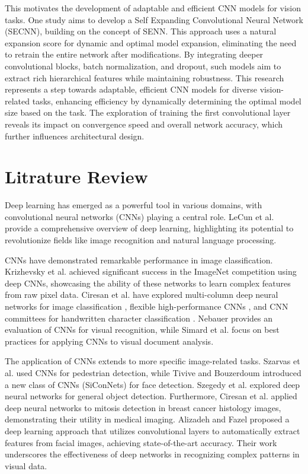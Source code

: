 \documentclass{article}
\begin{document}
This motivates the development of adaptable and efficient CNN models for vision tasks. One study aims to develop a Self Expanding Convolutional Neural Network (SECNN), building on the concept of SENN. This approach uses a natural expansion score for dynamic and optimal model expansion, eliminating the need to retrain the entire network after modifications. By integrating deeper convolutional blocks, batch normalization, and dropout, such models aim to extract rich hierarchical features while maintaining robustness. This research represents a step towards adaptable, efficient CNN models for diverse vision-related tasks, enhancing efficiency by dynamically determining the optimal model size based on the task. The exploration of training the first convolutional layer reveals its impact on convergence speed and overall network accuracy, which further influences architectural design.


\section*{Litrature Review}
Deep learning has emerged as a powerful tool in various domains, with convolutional neural networks (CNNs) playing a central role. LeCun et al. \cite{25} provide a comprehensive overview of deep learning, highlighting its potential to revolutionize fields like image recognition and natural language processing.

CNNs have demonstrated remarkable performance in image classification. Krizhevsky et al. \cite{22} achieved significant success in the ImageNet competition using deep CNNs, showcasing the ability of these networks to learn complex features from raw pixel data. Ciresan et al. have explored multi-column deep neural networks for image classification \cite{6}, flexible high-performance CNNs \cite{8}, and CNN committees for handwritten character classification \cite{9}. Nebauer \cite{28} provides an evaluation of CNNs for visual recognition, while Simard et al. \cite{29} focus on best practices for applying CNNs to visual document analysis.

The application of CNNs extends to more specific image-related tasks. Szarvas et al. \cite{31} used CNNs for pedestrian detection, while Tivive and Bouzerdoum \cite{33} introduced a new class of CNNs (SiConNets) for face detection. Szegedy et al. \cite{32} explored deep neural networks for general object detection. Furthermore, Ciresan et al. \cite{7} applied deep neural networks to mitosis detection in breast cancer histology images, demonstrating their utility in medical imaging. Alizadeh and Fazel \cite{2} proposed a deep learning approach that utilizes convolutional layers to automatically extract features from facial images, achieving state-of-the-art accuracy. Their work underscores the effectiveness of deep networks in recognizing complex patterns in visual data.
\end{document}
